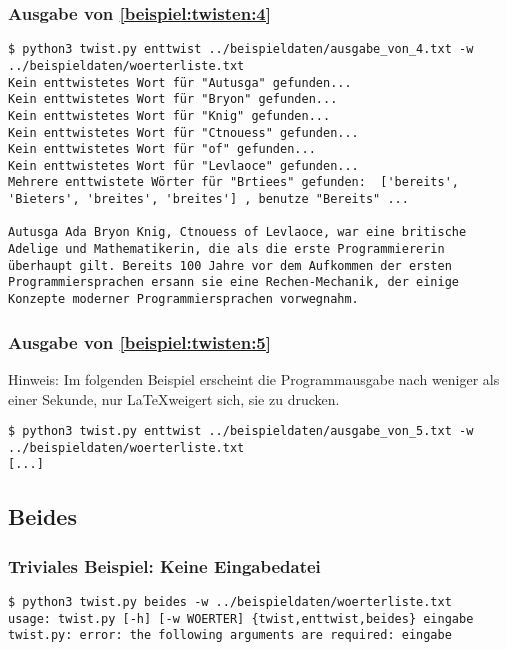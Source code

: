 \documentclass[a4paper,10pt,ngerman]{scrartcl}
\begin{document}
\subsubsection{Ausgabe von \ref{beispiel:twisten:4}}
\label{beispiel:enttwisten:4}
\begin{lstlisting}[breaklines=true]
$ python3 twist.py enttwist ../beispieldaten/ausgabe_von_4.txt -w ../beispieldaten/woerterliste.txt
Kein enttwistetes Wort für "Autusga" gefunden...
Kein enttwistetes Wort für "Bryon" gefunden...
Kein enttwistetes Wort für "Knig" gefunden...
Kein enttwistetes Wort für "Ctnouess" gefunden...
Kein enttwistetes Wort für "of" gefunden...
Kein enttwistetes Wort für "Levlaoce" gefunden...
Mehrere enttwistete Wörter für "Brtiees" gefunden:  ['bereits', 'Bieters', 'breites', 'breites'] , benutze "Bereits" ...

Autusga Ada Bryon Knig, Ctnouess of Levlaoce, war eine britische Adelige und Mathematikerin, die als die erste Programmiererin überhaupt gilt. Bereits 100 Jahre vor dem Aufkommen der ersten Programmiersprachen ersann sie eine Rechen-Mechanik, der einige Konzepte moderner Programmiersprachen vorwegnahm.
\end{lstlisting}


\subsubsection{Ausgabe von \ref{beispiel:twisten:5}}
\label{beispiel:enttwisten:5}
Hinweis: Im folgenden Beispiel erscheint die Programmausgabe nach weniger als einer Sekunde, nur \LaTeX weigert sich, sie zu drucken.
\begin{lstlisting}[breaklines=true]
$ python3 twist.py enttwist ../beispieldaten/ausgabe_von_5.txt -w ../beispieldaten/woerterliste.txt
[...]
\end{lstlisting}



\subsection{Beides}

\subsubsection{Triviales Beispiel: Keine Eingabedatei}
\begin{lstlisting}[breaklines=true]
$ python3 twist.py beides -w ../beispieldaten/woerterliste.txt
usage: twist.py [-h] [-w WOERTER] {twist,enttwist,beides} eingabe
twist.py: error: the following arguments are required: eingabe
\end{lstlisting}
\end{document}
